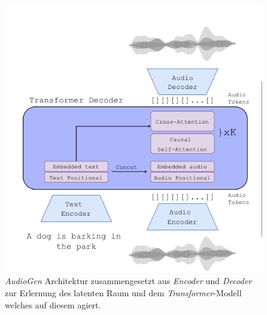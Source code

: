 \documentclass[
  a4paper,  %
  twoside,  %
  bibliography=totoc,
  headsepline,
  cleardoublepage=empty,
  parskip=half,
  draft=false
]{scrbook}
\begin{document}
\begin{figure}[h]
  \centering
  \includegraphics[width=.5\textwidth]{graphics/Audiogen.png}
  \caption[AudioGen Architektur]{\emph{AudioGen} Architektur zusammengesetzt aus \emph{Encoder} und \emph{Decoder} zur Erlernung des latenten Raum und dem \emph{Transformer}-Modell welches auf diesem agiert. \cite{kreuk_audiogen_2023}}
  \label{fig:audiogen}
\end{figure}
\end{document}
